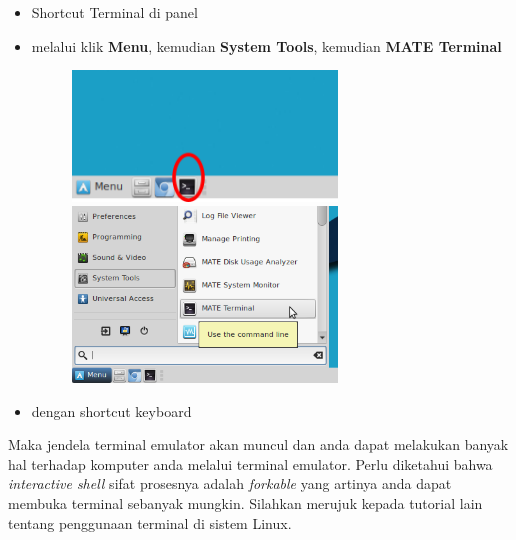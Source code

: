 \documentclass[12pt,]{article}
\begin{document}
	\begin{itemize}
		\item Shortcut Terminal di panel
		\item melalui klik \textbf{Menu}, kemudian \textbf{System Tools}, kemudian \textbf{MATE Terminal} 
		
		\begin{figure}[h]
			\centering
			\includegraphics[width=200pt]{png/panelterminal}
			\includegraphics[width=200pt]{png/termmenu}
		\end{figure}
	
		\item dengan shortcut keyboard 
	\end{itemize}

	Maka jendela terminal emulator akan muncul dan anda dapat melakukan banyak hal terhadap komputer anda melalui terminal emulator.
	Perlu diketahui bahwa \textit{interactive shell} sifat prosesnya adalah \textit{forkable} yang artinya anda dapat membuka terminal sebanyak mungkin.
	Silahkan merujuk kepada tutorial lain tentang penggunaan terminal di sistem Linux.
	
\end{document}
